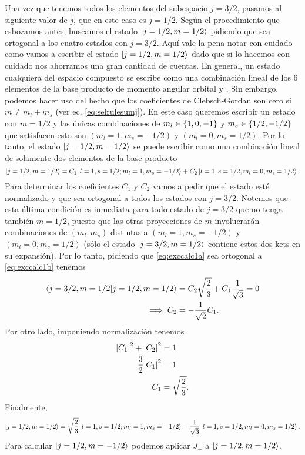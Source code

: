 \documentclass[10pt, a4paper]{article}
\numberwithin{equation}{subsection}
\begin{document}
Una vez que tenemos todos los elementos del subespacio $j = 3/2$, pasamos al
siguiente valor de $j$, que en este caso es $j = 1/2$. Según el procedimiento
que esbozamos antes, buscamos el estado $\ket{j=1/2, m=1/2}$ pidiendo que sea
ortogonal a los cuatro estados con $j=3/2$. Aquí vale la pena notar con cuidado
como vamos a escribir el estado $\ket{j=1/2, m=1/2}$ dado que si lo hacemos con
cuidado nos ahorramos una gran cantidad de cuentas. En general, un estado
cualquiera del espacio compuesto se escribe como una combinación lineal de los
6 elementos de la base producto de momento angular orbital y \spin. Sin
embargo, podemos hacer uso del hecho que los coeficientes de Clebsch-Gordan son
cero si $m \neq m_l + m_s$ (ver ec. \eqref{eq:selrulesumj}). En este caso
queremos escribir un estado con $m = 1/2$ y las únicas combinaciones de $m_l
\in \set{1, 0, -1}$ y $m_s \in \set{1/2, -1/2}$ que satisfacen esto son $(m_l =
1, m_s = -1/2)$ y $(m_l = 0, m_s = 1/2)$. Por lo tanto, el estado $\ket{j=1/2,
m=1/2}$ se puede escribir como una combinación lineal de solamente dos
elementos de la base producto
\begin{equation} \label{eq:exccalc1b}
  \ket{j=1/2, m=1/2} = C_1\ket{l=1,s=1/2;m_l=1,m_s=-1/2} +
    C_2\ket{l=1,s=1/2,m_l=0,m_s=1/2}.
\end{equation}
Para determinar los coeficientes $C_1$ y $C_2$ vamos a pedir que el estado esté
normalizado y que sea ortogonal a todos los estados con $j=3/2$. Notemos que
esta última condición es inmediata para todo estado de $j=3/2$ que no tenga
también $m=1/2$, puesto que las otras proyecciones de $m$ involucrarán
combinaciones de $(m_l,m_s)$ distintas a $(m_l = 1, m_s = -1/2)$ y $(m_l = 0,
m_s = 1/2)$ (sólo el estado $\ket{j=3/2,m=1/2}$ contiene estos dos kets en su
expansión). Por lo tanto, pidiendo que \eqref{eq:exccalc1a} sea ortogonal a
\eqref{eq:exccalc1b} tenemos
\begin{align}
  \braket{j=3/2, m=1/2}{j=1/2, m=1/2} &= C_2\sqrt{\frac{2}{3}} +
    C_1\frac{1}{\sqrt{3}} = 0 \\
  \implies C_2 &= -\frac{1}{\sqrt{2}}C_1.
\end{align}
Por otro lado, imponiendo normalización tenemos
\begin{align}
  \abs{C_1}^2 + \abs{C_2}^2 &= 1 \\
  \frac{3}{2}\abs{C_1}^2 &= 1 \\
  C_1 &= \sqrt{\frac{2}{3}}.
\end{align}
Finalmente,
\begin{equation}
  \ket{j=1/2, m=1/2} = \sqrt{\frac{2}{3}}\ket{l=1,s=1/2;m_l=1,m_s=-1/2} -
    \frac{1}{\sqrt{3}}\ket{l=1,s=1/2,m_l=0,m_s=1/2}.
\end{equation}
Para calcular $\ket{j=1/2, m=-1/2}$ podemos aplicar $J_-$ a $\ket{j=1/2,
m=1/2}$.
\end{document}
